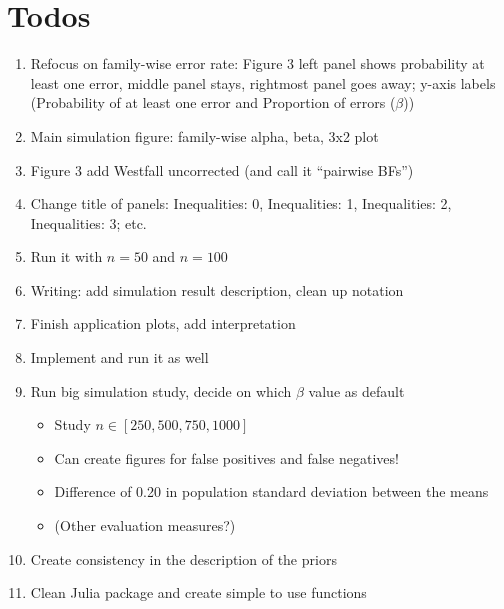 \documentclass[11pt,a4paper]{article}
\theoremstyle{definition} %
\theoremstyle{case}
\begin{document}
\section*{Todos}
\begin{enumerate}
   \item Refocus on family-wise error rate: Figure 3 left panel shows probability at least one error, middle panel stays, rightmost panel goes away; y-axis labels (Probability of at least one error and Proportion of errors ($\beta$))
   \item Main simulation figure: family-wise alpha, beta, 3x2 plot
   \item Figure 3 add Westfall uncorrected (and call it ``pairwise BFs'')
   \item Change title of panels: Inequalities: 0, Inequalities: 1, Inequalities: 2, Inequalities: 3; etc.
   \item Run it with $n = 50$ and $n = 100$
   
   \item Writing: add simulation result description, clean up notation
   
   \item Finish application plots, add interpretation
   \item Implement \textcite{westfall1997bayesian} and run it as well
   \item Run big simulation study, decide on which $\beta$ value as default
   \begin{itemize}
       \item Study $n \in [250, 500, 750, 1000]$
       \item Can create figures for false positives and false negatives!
       \item Difference of 0.20 in population standard deviation between the means
       \item (Other evaluation measures?)
   \end{itemize}
   \item Create consistency in the description of the priors
   \item Clean Julia package and create simple to use functions
\end{enumerate}
\end{document}
